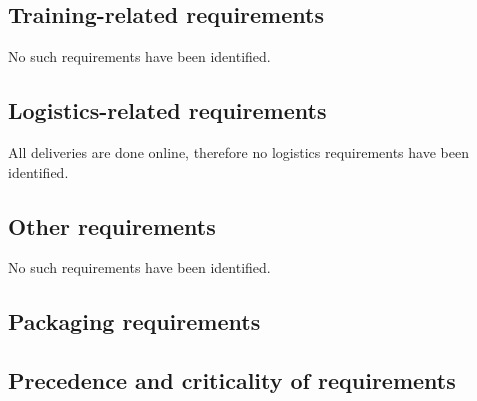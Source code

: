 \subsection{Training-related requirements}
No such requirements have been identified.

\subsection{Logistics-related requirements}
All deliveries are done online, therefore no logistics requirements have been identified.

\subsection{Other requirements}
No such requirements have been identified.

\subsection{Packaging requirements}

\subsection{Precedence and criticality of requirements}
